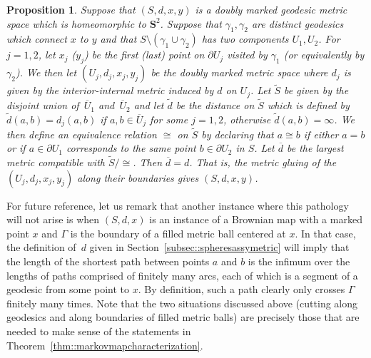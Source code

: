 \documentclass[10pt]{amsart}
\theoremstyle{plain}
\numberwithin{theorem}{section}
\newtheorem{proposition}[theorem]{Proposition}
\theoremstyle{definition}
\renewcommand{\S}{{\mathbf S}}
\let\ol\overline
\let\wt\widetilde
\begin{document}
\begin{proposition}
\label{prop::recover_sphere}
Suppose that $(S,d,x,y)$ is a doubly marked geodesic metric space which is homeomorphic to $\S^2$. Suppose that $\gamma_1,\gamma_2$ are distinct geodesics which connect $x$ to $y$ and that $S \setminus (\gamma_1 \cup \gamma_2)$ has two components $U_1,U_2$. For $j=1,2$, let $x_j$ (\resp $y_j$) be the first (\resp last) point on $\partial U_j$ visited by $\gamma_1$ (or equivalently by $\gamma_2$). We then let $(U_j,d_j,x_j,y_j)$ be the doubly marked metric space where $d_j$ is given by the interior-internal metric induced by $d$ on $U_j$. Let $\wt{S}$ be given by the disjoint union of~$\ol{U}_1$ and~$\ol{U}_2$ and let $\wt{d}$ be the distance on $\wt{S}$ which is defined by $\wt{d}(a,b) = d_j(a,b)$ if $a,b \in \ol{U}_j$ for some $j=1,2$, otherwise $\wt{d}(a,b) = \infty$. We then define an equivalence relation $\cong$ on $\wt{S}$ by declaring that $a \cong b$ if either $a=b$ or if $a \in \partial U_1$ corresponds to the same point $b \in \partial U_2$ in $S$. Let $\ol{d}$ be the largest metric compatible with $\wt{S}/\cong$. Then $\ol{d} = d$. That is, the metric gluing of the $(U_j,d_j,x_j,y_j)$ along their boundaries gives $(S,d,x,y)$.
\end{proposition}

For future reference, let us remark that another instance where this pathology will not arise is when $(S,d,x)$ is an instance of a Brownian map with a marked point $x$ and $\Gamma$ is the boundary of a filled metric ball centered at $x$. In that case, the definition of~$d$ given in Section~\ref{subsec::spheresassymetric} will imply that the length of the shortest path between points $a$ and $b$ is the infimum over the lengths of paths comprised of finitely many arcs, each of which is a segment of a geodesic from some point to $x$. By definition, such a path clearly only crosses $\Gamma$ finitely many times. Note that the two situations discussed above (cutting along geodesics and along boundaries of filled metric balls) are precisely those that are needed to make sense of the statements in Theorem~\ref{thm::markovmapcharacterization}.
\end{document}
